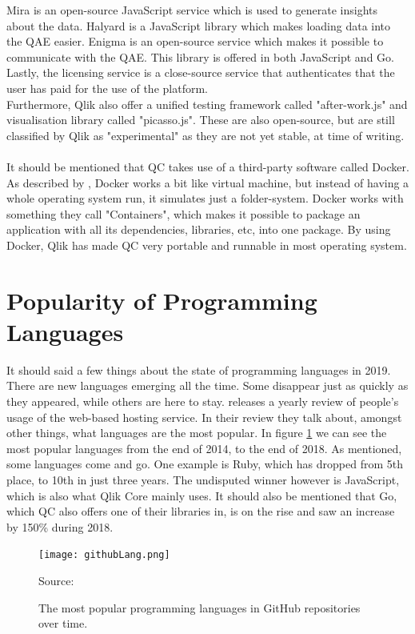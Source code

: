 \documentclass{cslthse-msc}
\newcommand{\source}[1]{\caption*{Source: {#1}} }
\begin{document}
    Mira is an open-source JavaScript service which is used to generate insights about the data. Halyard is a JavaScript library which makes loading data into the QAE easier. Enigma is an open-source service which makes it possible to communicate with the QAE. This library is offered in both JavaScript and Go. Lastly, the licensing service is a close-source service that authenticates that the user has paid for the use of the platform.\\
    Furthermore, Qlik also offer a unified testing framework called "after-work.js" and visualisation library called "picasso.js". These are also open-source, but are still classified by Qlik as "experimental" as they are not yet stable, at time of writing.\\
    \\
    It should be mentioned that QC takes use of a third-party software called Docker. As described by \cite{whatisdocker}, Docker works a bit like virtual machine, but instead of having a whole operating system run, it simulates just a folder-system. Docker works with something they call "Containers", which makes it possible to package an application with all its dependencies, libraries, etc, into one package. By using Docker, Qlik has made QC very portable and runnable in most operating system.
    \section{Popularity of Programming Languages}\label{sec:popLang}
    It should said a few things about the state of programming languages in 2019. There are new languages emerging all the time. Some disappear just as quickly as they appeared, while others are here to stay. \citet{github} releases a yearly review of people's usage of the web-based hosting service. In their review they talk about, amongst other things, what languages are the most popular. In figure \ref{fig:githubLang} we can see the most popular languages from the end of 2014, to the end of 2018. As mentioned, some languages come and go. One example is Ruby, which has dropped from 5th place, to 10th in just three years. The undisputed winner however is JavaScript, which is also what Qlik Core mainly uses. It should also be mentioned that Go, which QC also offers one of their libraries in, is on the rise and saw an increase by 150\% during 2018\citep{github}.
    \begin{figure}[H]
        \centering
        \texttt{[image: githubLang.png]}
        \caption{The most popular programming languages in GitHub repositories over time.}
        \label{fig:githubLang}
        \source{\cite{github}}
    \end{figure}
\end{document}
